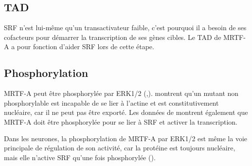  
 
 
 \subsection{TAD}
 
 SRF n'est lui-même qu'un transactivateur faible, c'est pourquoi il a besoin de ses cofacteurs pour démarrer la transcription de ses gènes cibles. Le TAD de MRTF-A a pour fonction d'aider SRF lors de cette étape. 
 
 
 
 \subsection{Phosphorylation}
	MRTF-A peut être phosphorylée par ERK1/2 (\cite{miralles_actin_2003},\cite{cen_myocardin/mkl_2004}). \cite{muelich} montrent qu'un mutant non phosphorylable est incapable de se lier à l'actine et est constitutivement nucléaire, car il ne peut pas être exporté. Les données de \cite{kalita_role_2006} montrent également que MRTF-A doit être phosphorylée pour se lier à SRF et activer la transcription.
	
	Dans les neurones, la phosphorylation de MRTF-A par ERK1/2 est même la voie principale de régulation de son activité, car la protéine est toujours nucléaire, mais elle n'active SRF qu'une fois phosphorylée (\cite{kalita_role_2006}). 
	

